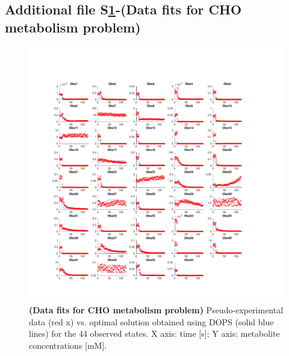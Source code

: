 \documentclass{bmcart}
\def\texttt{[image: ]}
\begin{document}
\begin{backmatter}
\subsection*{Additional file S\ref{fig-sims-b1}-(Data fits for CHO metabolism problem)}
\begin{figure}[ht]
\centering
\includegraphics[width=1.00\textwidth]{./rachelfigs/RecreatedFigureS1usingMS2_save.pdf}
\caption{\textbf {(Data fits for CHO metabolism problem)} Pseudo-experimental data (red x) vs. optimal solution obtained using DOPS (solid blue lines) for the 44 observed states. X axis: time [s]; Y axis: metabolite concentrations [mM].
}\label{fig-sims-b1}
\end{figure}


\end{backmatter}
\end{document}
